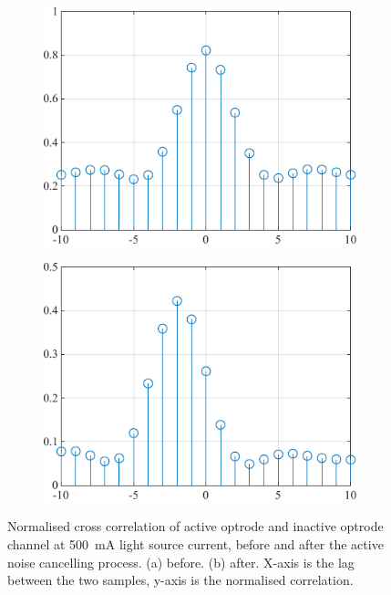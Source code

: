 \begin{figure}[h]
\centering
\begin{subfigure}{.5\textwidth}
  \centering
  \includegraphics[width=0.9\linewidth]{5-Experiment/CrossCoBeforeANC.pdf}
  \caption{}
  \label{fig_CrossCoBefore}
\end{subfigure}%
\begin{subfigure}{.5\textwidth}
  \centering
  \includegraphics[width=0.9\linewidth]{5-Experiment/CrossCoAfterANC.pdf}
  \caption{}
  \label{fig_CrossCoAfter}
\end{subfigure}
\caption{Normalised cross correlation of active optrode and inactive optrode channel at \qty{500}{mA} light source current, before and after the active noise cancelling process. (a) before. (b) after. X-axis is the lag between the two samples, y-axis is the normalised correlation.}
\label{fig_CrossCoBeforeAfterANC}
\end{figure}

